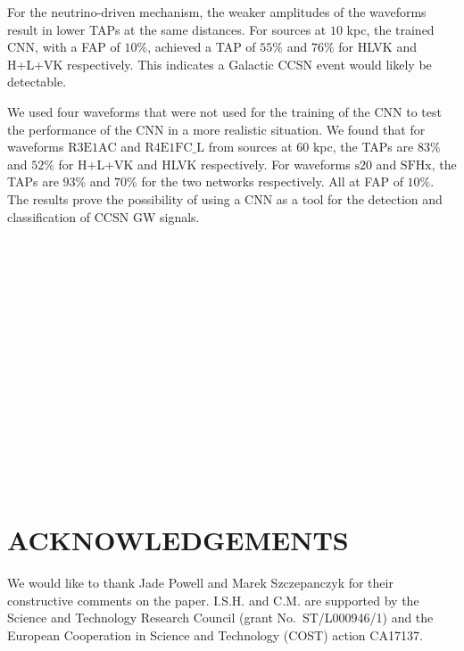 \documentclass[aps,twocolumn,showpacs,groupedaddress, nofootinbib]{revtex4}  %
\begin{document}
%
%
For the neutrino-driven mechanism, the weaker amplitudes of the waveforms
result in lower \acp{TAP} at the same distances.  For sources at $10$ kpc, the
trained \ac{CNN}, with a \ac{FAP} of $10\%$, achieved a \ac{TAP} of $55\%$ and
$76\%$ for HLVK and H+L+VK respectively. This indicates a Galactic \ac{CCSN}
event would likely be detectable.

%
%
We used four waveforms that were not used for the training of the \ac{CNN} to
test the performance of the \ac{CNN} in a more realistic situation. We found
that for waveforms $\text{R3E1AC}$ and $\text{R4E1FC\_L}$ from sources at
$60$ kpc, the \acp{TAP} are $83\%$ and $52\%$ for H+L+VK and HLVK respectively.
For waveforms $\text{s}20$ and $\text{SFHx}$, the \acp{TAP} are $93\%$ and
$70\%$ for the two networks respectively. All at \ac{FAP} of $10\%$. 
The results prove the possibility of
using a \ac{CNN} as a tool for the detection and classification of \ac{CCSN}
\ac{GW} signals.
\\
\\
\\
\\
\\
\\
\\
\\
\\
\\
\\
\\
\\
\\
\\
\\
\section{ACKNOWLEDGEMENTS}
We would like to thank Jade Powell and Marek Szczepanczyk for their 
constructive comments on the paper.
I.S.H. and C.M. are supported by the Science and Technology Research Council
(grant No.~ST/L000946/1) and the European Cooperation in Science and
Technology (COST) action CA17137. 


%
\end{document}
